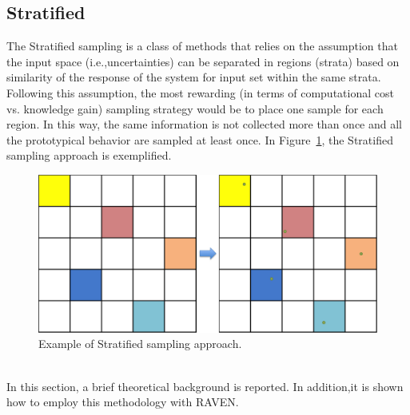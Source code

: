 \subsection{Stratified}
\label{sub:Stratified}
The Stratified sampling is a class of methods that relies on the assumption that the input space (i.e.,uncertainties)
can be separated in regions (strata) based on similarity of the response of the system for input set within the
same strata. Following this assumption, the most rewarding (in terms of computational cost vs. knowledge gain)
sampling strategy would be to place one sample for each region. In this way, the same information is not
collected more than once and all the prototypical behavior are sampled at least once. In
Figure~\ref{fig:StratifiedSamplingExample}, the Stratified sampling approach is exemplified.
 \begin{figure}[h!]
  \centering
  \includegraphics[scale=0.55]{pics/StratifiedSamplingExample.png}
  \caption{Example of Stratified sampling approach.}
  \label{fig:StratifiedSamplingExample}
 \end{figure}
\\In this section, a brief theoretical
background is reported. In addition,it is shown how to employ this methodology with RAVEN.
